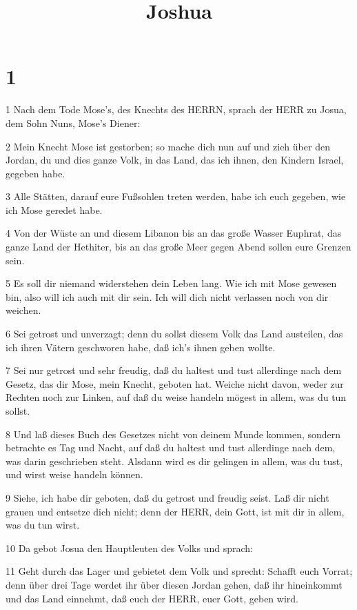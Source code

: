 

\title{Joshua}


\chapter{1}

\par 1 Nach dem Tode Mose's, des Knechts des HERRN, sprach der HERR zu Josua, dem Sohn Nuns, Mose's Diener:
\par 2 Mein Knecht Mose ist gestorben; so mache dich nun auf und zieh über den Jordan, du und dies ganze Volk, in das Land, das ich ihnen, den Kindern Israel, gegeben habe.
\par 3 Alle Stätten, darauf eure Fußsohlen treten werden, habe ich euch gegeben, wie ich Mose geredet habe.
\par 4 Von der Wüste an und diesem Libanon bis an das große Wasser Euphrat, das ganze Land der Hethiter, bis an das große Meer gegen Abend sollen eure Grenzen sein.
\par 5 Es soll dir niemand widerstehen dein Leben lang. Wie ich mit Mose gewesen bin, also will ich auch mit dir sein. Ich will dich nicht verlassen noch von dir weichen.
\par 6 Sei getrost und unverzagt; denn du sollst diesem Volk das Land austeilen, das ich ihren Vätern geschworen habe, daß ich's ihnen geben wollte.
\par 7 Sei nur getrost und sehr freudig, daß du haltest und tust allerdinge nach dem Gesetz, das dir Mose, mein Knecht, geboten hat. Weiche nicht davon, weder zur Rechten noch zur Linken, auf daß du weise handeln mögest in allem, was du tun sollst.
\par 8 Und laß dieses Buch des Gesetzes nicht von deinem Munde kommen, sondern betrachte es Tag und Nacht, auf daß du haltest und tust allerdinge nach dem, was darin geschrieben steht. Alsdann wird es dir gelingen in allem, was du tust, und wirst weise handeln können.
\par 9 Siehe, ich habe dir geboten, daß du getrost und freudig seist. Laß dir nicht grauen und entsetze dich nicht; denn der HERR, dein Gott, ist mit dir in allem, was du tun wirst.
\par 10 Da gebot Josua den Hauptleuten des Volks und sprach:
\par 11 Geht durch das Lager und gebietet dem Volk und sprecht: Schafft euch Vorrat; denn über drei Tage werdet ihr über diesen Jordan gehen, daß ihr hineinkommt und das Land einnehmt, daß euch der HERR, euer Gott, geben wird.
